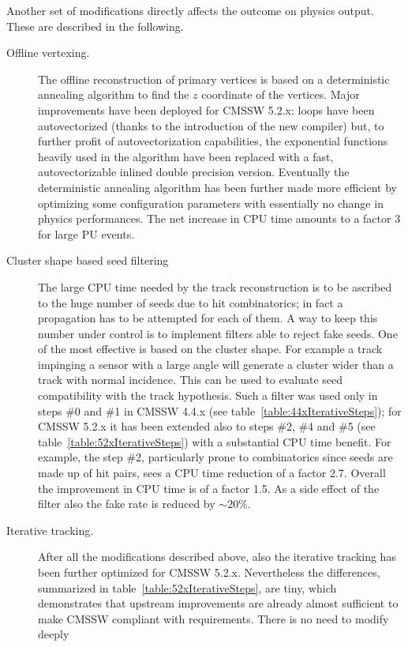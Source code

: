 Another set of modifications directly affects the outcome on physics
output. These are described in the following.
\begin{description}
\item[Offline vertexing.] The offline reconstruction of primary
  vertices is based on a deterministic annealing algorithm to find the
  $z$ coordinate of the vertices. Major improvements have been
  deployed for CMSSW 5.2.x: loops have been autovectorized (thanks to
  the introduction of the new compiler) but, to further profit of
  autovectorization capabilities, the exponential functions heavily
  used in the algorithm have been replaced with a fast,
  autovectorizable inlined double precision version. Eventually the
  deterministic annealing algorithm has been further made more
  efficient by optimizing some configuration parameters
  with essentially no change in physics performances. The net increase
  in CPU time amounts to a factor 3 for large PU events.
\item[Cluster shape based seed filtering] The large CPU time needed by
  the track reconstruction is to be ascribed to the huge number of
  seeds due to hit combinatorics; in fact a propagation has to be attempted for
  each of them. A way to keep this number under control is to
  implement filters able to reject fake seeds. One of the most
  effective is based on the cluster shape. For example a track
  impinging a sensor with a large angle will generate a cluster
  wider than a track with normal incidence. This can be used to
  evaluate seed compatibility with the track hypothesis. Such a filter
  was used only in steps \#0 and \#1 in CMSSW 4.4.x (see
  table~\ref{table:44xIterativeSteps}); for CMSSW 5.2.x it has been
  extended also to steps \#2, \#4 and \#5 (see
  table~\ref{table:52xIterativeSteps}) with a substantial CPU time
  benefit. For example, the step \#2, 
  particularly prone to combinatorics since seeds are made up of hit
  pairs, sees a CPU time reduction of a factor 2.7. Overall the
  improvement in CPU time is of a factor 1.5. As a side effect of the
  filter also the fake rate is reduced by $\sim20\%$.
\item[Iterative tracking.] After all the modifications
  described above, also the iterative tracking has been further optimized
  for CMSSW 5.2.x. Nevertheless the differences, summarized in
  table~\ref{table:52xIterativeSteps}, are tiny, which demonstrates
  that upstream improvements are already almost sufficient to make
  CMSSW compliant with requirements. There is no need to modify deeply

\end{description}
